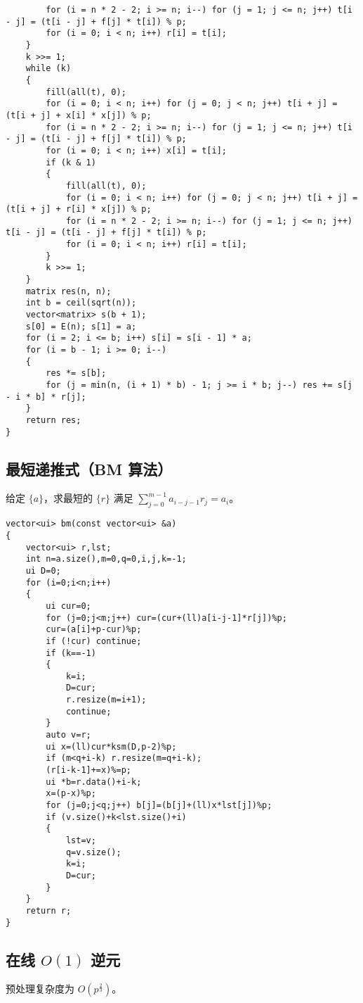 \documentclass[12pt]{ctexart}
\begin{document}
\begin{lstlisting}
		for (i = n * 2 - 2; i >= n; i--) for (j = 1; j <= n; j++) t[i - j] = (t[i - j] + f[j] * t[i]) % p;
		for (i = 0; i < n; i++) r[i] = t[i];
	}
	k >>= 1;
	while (k)
	{
		fill(all(t), 0);
		for (i = 0; i < n; i++) for (j = 0; j < n; j++) t[i + j] = (t[i + j] + x[i] * x[j]) % p;
		for (i = n * 2 - 2; i >= n; i--) for (j = 1; j <= n; j++) t[i - j] = (t[i - j] + f[j] * t[i]) % p;
		for (i = 0; i < n; i++) x[i] = t[i];
		if (k & 1)
		{
			fill(all(t), 0);
			for (i = 0; i < n; i++) for (j = 0; j < n; j++) t[i + j] = (t[i + j] + r[i] * x[j]) % p;
			for (i = n * 2 - 2; i >= n; i--) for (j = 1; j <= n; j++) t[i - j] = (t[i - j] + f[j] * t[i]) % p;
			for (i = 0; i < n; i++) r[i] = t[i];
		}
		k >>= 1;
	}
	matrix res(n, n);
	int b = ceil(sqrt(n));
	vector<matrix> s(b + 1);
	s[0] = E(n); s[1] = a;
	for (i = 2; i <= b; i++) s[i] = s[i - 1] * a;
	for (i = b - 1; i >= 0; i--)
	{
		res *= s[b];
		for (j = min(n, (i + 1) * b) - 1; j >= i * b; j--) res += s[j - i * b] * r[j];
	}
	return res;
}
\end{lstlisting}

\subsection{最短递推式（BM 算法）}

给定 $\{a\}$，求最短的 $\{r\}$ 满足 $\sum\limits_{j=0}^{m-1} a_{i-j-1}r_j=a_i$。

\begin{lstlisting}
vector<ui> bm(const vector<ui> &a)
{
	vector<ui> r,lst;
	int n=a.size(),m=0,q=0,i,j,k=-1;
	ui D=0;
	for (i=0;i<n;i++)
	{
		ui cur=0;
		for (j=0;j<m;j++) cur=(cur+(ll)a[i-j-1]*r[j])%p;
		cur=(a[i]+p-cur)%p;
		if (!cur) continue;
		if (k==-1)
		{
			k=i;
			D=cur;
			r.resize(m=i+1);
			continue;
		}
		auto v=r;
		ui x=(ll)cur*ksm(D,p-2)%p;
		if (m<q+i-k) r.resize(m=q+i-k);
		(r[i-k-1]+=x)%=p;
		ui *b=r.data()+i-k;
		x=(p-x)%p;
		for (j=0;j<q;j++) b[j]=(b[j]+(ll)x*lst[j])%p;
		if (v.size()+k<lst.size()+i)
		{
			lst=v;
			q=v.size();
			k=i;
			D=cur;
		}
	}
	return r;
}
\end{lstlisting}

\subsection{在线 $O(1)$ 逆元}

预处理复杂度为 $O(p^{\frac{2}{3}})$。
\end{document}
